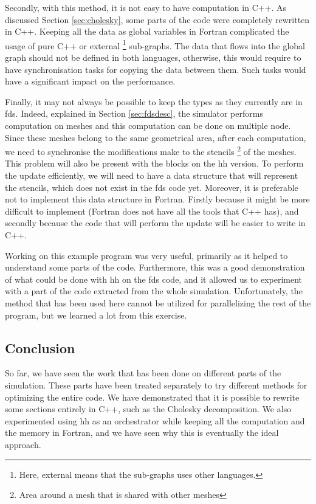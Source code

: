 Secondly, with this method, it is not easy to have computation in C++. As
discussed Section \ref{sec:cholesky}, some parts of the code were completely
rewritten in C++. Keeping all the data as global variables in Fortran
complicated the usage of pure C++ or external \footnote{Here, external means
that the sub-graphs uses other languages.} sub-graphs. The data that flows into
the global graph should not be defined in both languages, otherwise, this would
require to have synchronisation tasks for copying the data between them. Such
tasks would have a significant impact on the performance.

Finally, it may not always be possible to keep the types as they currently are
in \gls{fds}. Indeed, explained in Section \ref{sec:fdsdesc}, the simulator
performs computation on meshes and this computation can be done on multiple
node. Since these meshes belong to the same geometrical area, after each
computation, we need to synchronise the modifications make to the
stencils \footnote{Area around a mesh that is shared with other meshes} of the
meshes. This problem will also be present with the blocks on the \gls{hh}
version. To perform the update efficiently, we will need to have a data
structure that will represent the stencils, which does not
exist in the \gls{fds} code yet. Moreover, it is preferable not to implement
this data structure in Fortran. Firstly because it might be more difficult to
implement (Fortran does not have all the tools that C++ has), and secondly
because the code that will perform the update will be easier to write in C++.

Working on this example program was very useful, primarily as it helped to
understand some parts of the code. Furthermore, this was a good demonstration
of what could be done with \gls{hh} on the \gls{fds} code, and it allowed us to
experiment with a part of the code extracted from the whole simulation.
Unfortunately, the method that has been used here cannot be utilized for
parallelizing the rest of the program, but we learned a lot from this exercise.

\subsection{Conclusion}
\label{sec:fdsconcl}

So far, we have seen the work that has been done on different parts of the
simulation. These parts have been treated separately to try different methods
for optimizing the entire code. We have demonstrated that it is possible to
rewrite some sections entirely in C++, such as the Cholesky decomposition. We
also experimented using \gls{hh} as an orchestrator while keeping all the
computation and the memory in Fortran, and we have seen why this is eventually
the ideal approach.

